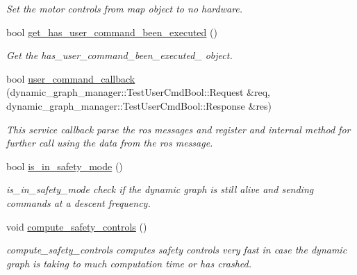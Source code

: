 \begin{DoxyCompactItemize}
\begin{DoxyCompactList}\small\item\em Set the motor controls from map object to no hardware. \end{DoxyCompactList}\item 
\mbox{\label{classdynamic__graph__manager_1_1SimpleDGM_a08793eb7410b2820e00e028688d890a9}} 
bool \hyperlink{classdynamic__graph__manager_1_1SimpleDGM_a08793eb7410b2820e00e028688d890a9}{get\+\_\+has\+\_\+user\+\_\+command\+\_\+been\+\_\+executed} ()
\begin{DoxyCompactList}\small\item\em Get the has\+\_\+user\+\_\+command\+\_\+been\+\_\+executed\+\_\+ object. \end{DoxyCompactList}\item 
bool \hyperlink{classdynamic__graph__manager_1_1SimpleDGM_adb40055a916691d326bc6466eab9680b}{user\+\_\+command\+\_\+callback} (dynamic\+\_\+graph\+\_\+manager\+::\+Test\+User\+Cmd\+Bool\+::\+Request \&req, dynamic\+\_\+graph\+\_\+manager\+::\+Test\+User\+Cmd\+Bool\+::\+Response \&res)
\begin{DoxyCompactList}\small\item\em This service callback parse the ros messages and register and internal method for further call using the data from the ros message. \end{DoxyCompactList}\item 
bool \hyperlink{classdynamic__graph__manager_1_1SimpleDGM_a5fe81f9feb5d982761d7a427aa31e7b4}{is\+\_\+in\+\_\+safety\+\_\+mode} ()
\begin{DoxyCompactList}\small\item\em is\+\_\+in\+\_\+safety\+\_\+mode check if the dynamic graph is still alive and sending commands at a descent frequency. \end{DoxyCompactList}\item 
\mbox{\label{classdynamic__graph__manager_1_1SimpleDGM_a37b28e687ce4e724770f5c9f23da4d4f}} 
void \hyperlink{classdynamic__graph__manager_1_1SimpleDGM_a37b28e687ce4e724770f5c9f23da4d4f}{compute\+\_\+safety\+\_\+controls} ()
\begin{DoxyCompactList}\small\item\em compute\+\_\+safety\+\_\+controls computes safety controls very fast in case the dynamic graph is taking to much computation time or has crashed. \end{DoxyCompactList}\end{DoxyCompactItemize}
